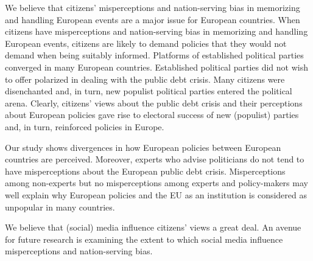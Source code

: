 We believe that citizens' misperceptions and nation-serving bias in memorizing and handling European events are a major issue for European countries. When citizens have misperceptions and nation-serving bias in memorizing and handling European events, citizens are likely to demand policies that they would not demand when being suitably informed. Platforms of established political parties converged in many European countries. Established political parties did not wish to offer polarized in dealing with the public debt crisis. Many citizens were disenchanted and, in turn, new populist political parties entered the political arena. Clearly, citizens' views about the public debt crisis and their perceptions about European policies gave rise to electoral success of new (populist) parties and, in turn, reinforced policies in Europe. 

Our study shows divergences in how European policies between European countries are perceived. Moreover, experts who advise politicians do not tend to have misperceptions about the European public debt crisis. Misperceptions among non-experts but no misperceptions among experts and policy-makers may well explain why European policies and the EU as an institution is considered as unpopular in many countries. 

We believe that (social) media influence citizens' views a great deal. An avenue for future research is examining the extent to which social media influence misperceptions and nation-serving bias. 